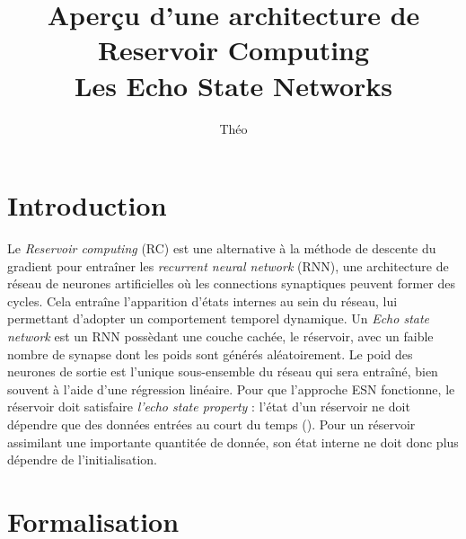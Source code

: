 \documentclass[12pt]{article}
\title{Aperçu d'une architecture de Reservoir Computing\\Les Echo State Networks}
\author{Théo \bsc{Biasutto--Lervat}}
\date{}
\begin{document}
\maketitle

\section{Introduction}

Le \textit{Reservoir computing} (RC) est une alternative à la méthode de descente du gradient pour entraîner les \textit{recurrent neural network} (RNN), une architecture de réseau de neurones artificielles où les connections synaptiques peuvent former des cycles. Cela entraîne l'apparition d'états internes au sein du réseau, lui permettant d'adopter un comportement temporel dynamique.\newline
Un \textit{Echo state network} est un RNN possèdant une couche cachée, le réservoir, avec un faible nombre de synapse dont les poids sont générés aléatoirement. Le poid des neurones de sortie est l'unique sous-ensemble du réseau qui sera entraîné, bien souvent à l'aide d'une régression linéaire.\newline
Pour que l'approche ESN fonctionne, le réservoir doit satisfaire \textit{l'echo state property} : l'état d'un réservoir ne doit dépendre que des données entrées au court du temps (\cite{Herbert10}). Pour un réservoir assimilant une importante quantitée de donnée, son état interne ne doit donc plus dépendre de l'initialisation.


\section{Formalisation}
\end{document}
